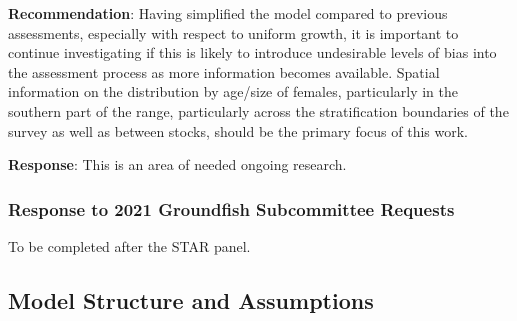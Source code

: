 \documentclass[11pt,
  english,
  a4paper,
]{article}
\begin{document}
\leavevmode\tagmcend\tagstructend\par


\textbf{Recommendation}: Having simplified the model compared to previous assessments, especially with respect to uniform growth, it is important to continue investigating if this is likely to introduce undesirable levels of bias into the assessment process as more information becomes available. Spatial information on the distribution by age/size of females, particularly in the southern part of the range, particularly across the stratification boundaries of the survey as well as between stocks, should be the primary focus of this work.

\leavevmode\tagmcend\tagstructend\par


\textbf{Response}: This is an area of needed ongoing research.

\leavevmode\tagmcend\tagstructend\par


\hypertarget{response-to-2021-groundfish-subcommittee-requests}{%
\subsubsection{Response to 2021 Groundfish Subcommittee Requests}\label{response-to-2021-groundfish-subcommittee-requests}}

\leavevmode\tagmcend\tagstructend


To be completed after the STAR panel.

\leavevmode\tagmcend\tagstructend\par


\hypertarget{model-structure-and-assumptions}{%
\subsection{Model Structure and Assumptions}\label{model-structure-and-assumptions}}

\leavevmode\tagmcend\tagstructend

\end{document}
